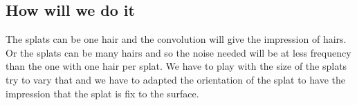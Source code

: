 \documentclass[12pt]{article}
\begin{document}
\subsection{How will we do it}

The splats can be one hair and the convolution will give the impression of hairs. Or the splats can be many hairs and so the noise needed will be at less frequency than the one with one hair per splat. We have to play with the size of the splats try to vary that and we have to adapted the orientation of the splat to have the impression that the splat is fix to the surface.
\end{document}
